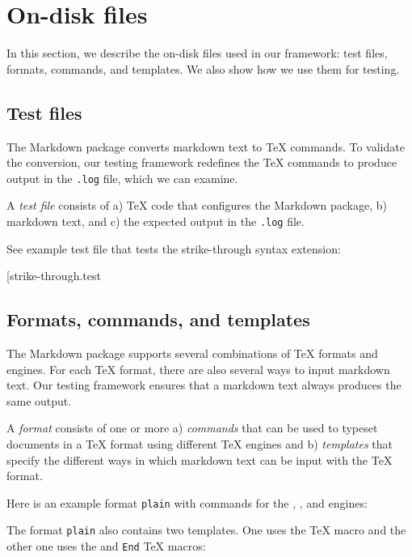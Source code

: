 \documentclass[final]{ltugboat}
\begin{document}
\section{On-disk files}
\label{sec:on-disk-files}

In this section, we describe the on-disk files used in our framework: test files, formats, commands, and templates. We also show how we use them for testing.

\subsection{Test files}
\label{sec:test-files}

The Markdown package converts markdown text to \TeX{} commands. To validate the conversion, our testing framework redefines the \TeX{} commands to produce output in the \texttt{.log} file, which we can examine.

A \emph{test file} consists of a) \TeX{} code that configures the Markdown package, b) markdown text, and c) the expected output in the \texttt{.log} file.

See example test file  that tests the strike-through syntax extension:

\smallskip
\noindent
\example*[{strike-through.test}

\subsection{Formats, commands, and templates}
\label{sec:formats-commands-and-templates}

The Markdown package supports several combinations of \TeX{} formats and engines. For each \TeX{} format, there are also several ways to input markdown text. Our testing framework ensures that a markdown text always produces the same output.

A \emph{format} consists of one or more a) \emph{commands} that can be used to typeset documents in a \TeX{} format using different \TeX{} engines and b) \emph{templates} that specify the different ways in which markdown text can be input with the \TeX{} format.

Here is an example format \texttt{plain} with commands for the , , and  engines:

\smallskip
\noindent
{}

\smallskip
\noindent
The format \texttt{plain} also contains two templates. One uses the  \TeX{} macro and the other one uses the  and \texttt{End} \TeX{} macros:
\end{document}
